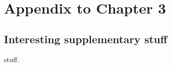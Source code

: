 \chapter{Appendix to Chapter 3}
\label{chap:appendix_ch3}

\section{Interesting supplementary stuff}
stuff.